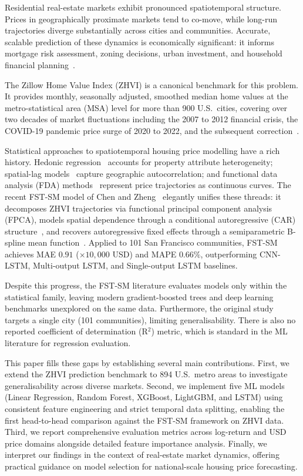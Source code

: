 \documentclass[runningheads]{llncs}
\begin{document}
Residential real-estate markets exhibit pronounced spatiotemporal
structure.  Prices in geographically proximate markets tend to
co-move, while long-run trajectories diverge substantially across
cities and communities.  Accurate, scalable prediction of these
dynamics is economically significant: it informs mortgage risk
assessment, zoning decisions, urban investment, and household
financial planning~\cite{ref_krause_bitter}.

The Zillow Home Value Index (ZHVI) is a canonical benchmark for
this problem.  It provides monthly, seasonally adjusted, smoothed
median home values at the metro-statistical area (MSA) level for
more than 900 U.S.\ cities, covering over two decades of market
fluctuations including the 2007 to 2012 financial crisis, the
COVID-19 pandemic price surge of 2020 to 2022, and the subsequent
correction~\cite{ref_zillow}.

Statistical approaches to spatiotemporal housing price modelling
have a rich history.  Hedonic regression~\cite{ref_rosen} accounts
for property attribute heterogeneity; spatial-lag
models~\cite{ref_anselin} capture geographic autocorrelation;
and functional data analysis (FDA) methods~\cite{ref_ramsay_2002}
represent price trajectories as continuous curves.
The recent FST-SM model of Chen and Zheng~\cite{ref_fmem2023}
elegantly unifies these threads: it decomposes ZHVI trajectories
via functional principal component analysis (FPCA), models
spatial dependence through a conditional autoregressive (CAR)
structure~\cite{ref_zhang_fcar}, and recovers autoregressive fixed
effects through a semiparametric B-spline mean
function~\cite{ref_shen1998}.
Applied to 101 San Francisco communities, FST-SM achieves
MAE $0.91$ ($\times 10{,}000$ USD) and MAPE $0.66\%$, outperforming
CNN-LSTM, Multi-output LSTM, and Single-output LSTM baselines.

Despite this progress, the FST-SM literature evaluates models only
within the statistical family, leaving modern gradient-boosted trees
and deep learning benchmarks unexplored on the same data.
Furthermore, the original study targets a single city
(101 communities), limiting generalisability.  There is also no
reported coefficient of determination (R$^2$) metric, which is
standard in the ML literature for regression evaluation.

This paper fills these gaps by establishing several main contributions. First, we extend the ZHVI prediction benchmark to 894 U.S.\ metro areas to investigate generalisability across diverse markets. Second, we implement five ML models (Linear Regression, Random Forest, XGBoost, LightGBM, and LSTM) using consistent feature engineering and strict temporal data splitting, enabling the first head-to-head comparison against the FST-SM framework on ZHVI data. Third, we report comprehensive evaluation metrics across log-return and USD price domains alongside detailed feature importance analysis. Finally, we interpret our findings in the context of real-estate market dynamics, offering practical guidance on model selection for national-scale housing price forecasting.
\end{document}
